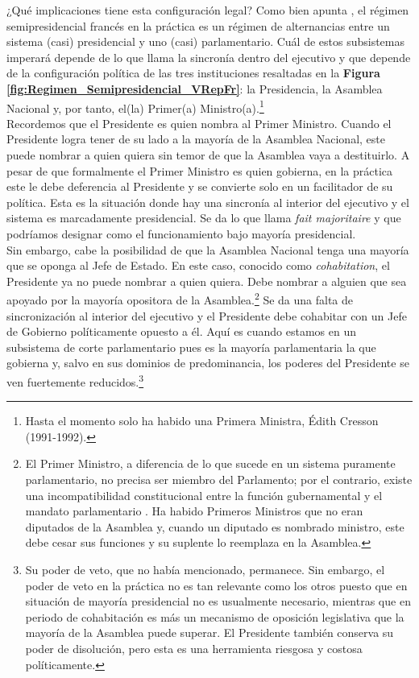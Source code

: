 ¿Qué implicaciones tiene esta configuración legal? Como bien apunta \textcite{Carpizo04}, el régimen semipresidencial francés en la práctica es un régimen de alternancias entre un sistema (casi) presidencial y uno (casi) parlamentario. Cuál de estos subsistemas imperará depende de lo que \textcite{Marrani09} llama la sincronía dentro del ejecutivo y que depende de la configuración política de las tres instituciones resaltadas en la \textbf{Figura \ref{fig:Regimen_Semipresidencial_VRepFr}}: la Presidencia, la Asamblea Nacional y, por tanto, el(la) Primer(a) Ministro(a).\footnote{Hasta el momento solo ha habido una Primera Ministra, Édith Cresson (1991-1992).}\\ 

Recordemos que el Presidente es quien nombra al Primer Ministro. Cuando el Presidente logra tener de su lado a la mayoría de la Asamblea Nacional, este puede nombrar a quien quiera sin temor de que la Asamblea vaya a destituirlo. A pesar de que formalmente el Primer Ministro es quien gobierna, en la práctica este le debe deferencia al Presidente y se convierte solo en un facilitador de su política. Esta es la situación donde hay una sincronía al interior del ejecutivo y el sistema es marcadamente presidencial. Se da lo que \citeauthor{Marrani09} llama \textit{fait majoritaire} y que podríamos designar como el funcionamiento bajo mayoría presidencial.\\ 

Sin embargo, cabe la posibilidad de que la Asamblea Nacional tenga una mayoría que se oponga al Jefe de Estado. En este caso, conocido como \textit{cohabitation}, el Presidente ya no puede nombrar a quien quiera. Debe nombrar a alguien que sea apoyado por la mayoría opositora de la Asamblea.\footnote{El Primer Ministro, a diferencia de lo que sucede en un sistema puramente parlamentario, no precisa ser miembro del Parlamento; por el contrario, existe una incompatibilidad constitucional entre la función gubernamental y el mandato parlamentario \parencite{ConstFr}. Ha habido Primeros Ministros que no eran diputados de la Asamblea y, cuando un diputado es nombrado ministro, este debe cesar sus funciones y su suplente lo reemplaza en la Asamblea.} Se da una falta de sincronización al interior del ejecutivo y el Presidente debe cohabitar con un Jefe de Gobierno políticamente opuesto a él. Aquí es cuando estamos en un subsistema de corte parlamentario pues es la mayoría parlamentaria la que gobierna y, salvo en sus dominios de predominancia, los poderes del Presidente se ven fuertemente reducidos.\footnote{Su poder de veto, que no había mencionado, permanece. Sin embargo, el poder de veto en la práctica no es tan relevante como los otros puesto que en situación de mayoría presidencial no es usualmente necesario, mientras que en periodo de cohabitación es más un mecanismo de oposición legislativa que la mayoría de la Asamblea puede superar. El Presidente también conserva su poder de disolución, pero esta es una herramienta riesgosa y costosa políticamente.}\\ 

